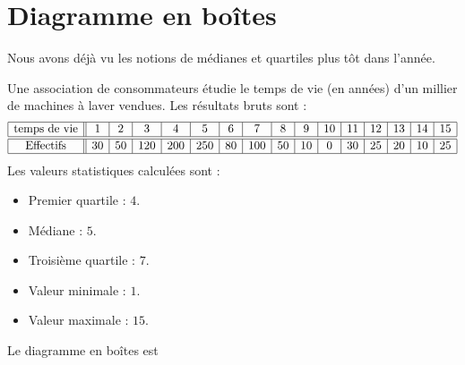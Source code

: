 

\section{Diagramme en boîtes}

Nous avons déjà vu les notions de médianes et quartiles plus tôt dans l'année.

\begin{example}
    Une association de consommateurs étudie le temps de vie (en années) d'un millier de machines à laver vendues. Les résultats bruts sont :
    \begin{equation*}
        \begin{array}[]{|c||c|c|c|c|c|c|c|c|c|c|c|c|c|c|c|}
            \hline
            \text{temps de vie}&1&2&3&4&5&6&7&8&9&10&11&12&13&14&15\\
            \hline\hline
            \text{Effectifs}&30&50&120&200&250&80&100&50&10&0&30&25&20&10&25\\
            \hline
        \end{array}
    \end{equation*}
    Les valeurs statistiques calculées sont :
    \begin{multicols}{2}
        \begin{itemize}
            \item
                Premier quartile : $4$.
            \item
                Médiane : \( 5\).
            \item
                Troisième quartile : \( 7\).
            \item
                Valeur minimale : \( 1\).
            \item 
                Valeur maximale : \( 15\).
        \end{itemize}
    \end{multicols}

    Le diagramme en boîtes est

\begin{center}

\end{center}


\end{example}
